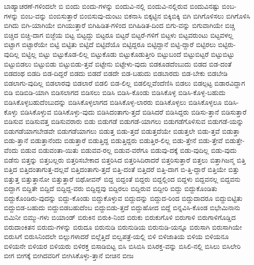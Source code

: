 {ಬಾಹ್ಯಾಚರಣೆ-ಗಳಿಂದಲೇ
ಬಿ
ಬಿಂದು
ಬಿಂದು-ಗಳನ್ನು
ಬಿಂದುವಿ-ನಲ್ಲಿ
ಬಿಂದುವಿ-ನಲ್ಲಿರುವ
ಬಿಂದುವಿನಷ್ಟು
ಬಿಂಬ-ಗಳನ್ನು
ಬಿಂಬ-ವನ್ನು
ಬಿಂಬಿಸುತ್ತಾರೆ
ಬಿಂಬಿಸುವು-ದುಂಟು
ಬಿಕನಾಸಿ
ಬಿಕ್ಕಟ್ಟಿನ
ಬಿಕ್ಕಿಬಿಕ್ಕಿ
ಬಿಗಿ
ಬಿಗಿಗೊಳಿಸಲು
ಬಿಗಿಗೊಳಿಸಿ
ಬಿಗಿದು
ಬಿಗಿ-ಯಾಗಿಯೇ
ಬಿಗಿಯುತ್ತಾರೆ
ಬಿಗಿಹಿಡಿತ-ಗಳಿಂದ
ಬಿಗಿಹಿಡಿತ-ದಿಂದ
ಬಿಗು-ವನ್ನು
ಬಿಗುವಾಗಿಯೇ
ಬಿಚ್ಚಿ
ಬಿಚ್ಚಿದ
ಬಿಚ್ಚಿ-ದಾಗ
ಬಿಜ್ಜೆಯ
ಬಿಟ್ಟ
ಬಿಟ್ಟದ್ದು
ಬಿಟ್ಟರೂ
ಬಿಟ್ಟರೆ
ಬಿಟ್ಟರೆ-ಗಳಿಗೆ
ಬಿಟ್ಟಳು
ಬಿಟ್ಟವರುಂಟು
ಬಿಟ್ಟವಳಲ್ಲ
ಬಿಟ್ಟಾಗ
ಬಿಟ್ಟಾರೆಯೇ
ಬಿಟ್ಟಿ
ಬಿಟ್ಟಿತು
ಬಿಟ್ಟಿದೆ
ಬಿಟ್ಟಿದೆಯೊ
ಬಿಟ್ಟಿದ್ದರೂ
ಬಿಟ್ಟಿದ್ದಾನೆ
ಬಿಟ್ಟಿ-ದ್ದಾರೆ
ಬಿಟ್ಟಿರಲು
ಬಿಟ್ಟಿರು-ವುದಿಲ್ಲ
ಬಿಟ್ಟಿಲ್ಲ
ಬಿಟ್ಟು
ಬಿಟ್ಟುಕೊಡ-ಲಿಲ್ಲ
ಬಿಟ್ಟುಕೊಡು
ಬಿಟ್ಟುಕೊಡುತ್ತೀರಿ
ಬಿಟ್ಟುಬಂದೆ
ಬಿಟ್ಟುಬಿಟ್ಟರೆ
ಬಿಟ್ಟುಬಿಟ್ಟು
ಬಿಟ್ಟುಬಿಡಲು
ಬಿಟ್ಟುಬಿಡು
ಬಿಟ್ಟುಬಿಡು-ತ್ತವೆ
ಬಿಟ್ಟೇನು
ಬಿಟ್ಟೇಳು-ವುದು
ಬಿಡಕೂಡದೆಂಬುದು
ಬಿಡದ
ಬಿಡ-ದಂತೆ
ಬಿಡದಂಥ
ಬಿಡದಿ
ಬಿಡ-ದಿದ್ದರೆ
ಬಿಡದು
ಬಿಡದೆ
ಬಿಡದೇ
ಬಿಡ-ಬಹುದು
ಬಿಡಬಾರದು
ಬಿಡ-ಬೇಕು
ಬಿಡಬೇಡಿ
ಬಿಡಲಾಗು-ವುದಿಲ್ಲ
ಬಿಡಲಾರವು
ಬಿಡಲಾರೆ
ಬಿಡಲಿ
ಬಿಡ-ಲಿಲ್ಲ
ಬಿಡಲಿಲ್ಲವೆಂದೆಣಿಸಿ
ಬಿಡಲು
ಬಿಡಲ್ಪಟ್ಟ
ಬಿಡಾರವಿದ್ದಾಗ
ಬಿಡಿ
ಬಿಡಿಬಿಡಿ-ಯಾಗಿ
ಬಿಡಿಸಲಾಗದ
ಬಿಡಿಸಲು
ಬಿಡಿಸಿ
ಬಿಡಿಸಿ-ಕೊಂಡು
ಬಿಡಿಸಿಕೊಳ್ಳ
ಬಿಡಿಸಿ-ಕೊಳ್ಳ-ಬಹುದು
ಬಿಡಿಸಿಕೊಳ್ಳಬಹುದೆಂಬುದನ್ನು
ಬಿಡಿಸಿಕೊಳ್ಳಲಾಗದ
ಬಿಡಿಸಿಕೊಳ್ಳ-ಲಾರರು
ಬಿಡಿಸಿಕೊಳ್ಳಲು
ಬಿಡಿಸಿಕೊಳ್ಳಲೂ
ಬಿಡಿಸಿ-ಕೊಳ್ಳು
ಬಿಡಿಸಿಕೊಳ್ಳುವ
ಬಿಡಿಸಿಕೊಳ್ಳು-ವುದು
ಬಿಡಿಸಿದಂತಾಗು-ತ್ತದೆ
ಬಿಡಿಸಿದರೆ
ಬಿಡಿಸಿದ್ದರು
ಬಿಡಿಸು-ತ್ತಾನೆ
ಬಿಡಿಸುತ್ತಾರೆ
ಬಿಡಿಸುವ
ಬಿಡಿಸುವತ್ತ
ಬಿಡಿಸುವರಾರು
ಬಿಡು
ಬಿಡುಗಡೆ
ಬಿಡುಗಡೆ-ಯಾಗಲು
ಬಿಡುಗಡೆಗೊಳಿಸುವ
ಬಿಡುಗಡೆ-ಯನ್ನು
ಬಿಡುಗಡೆಯಾಗಬೇಡವೇ
ಬಿಡುಗಡೆಯಾಗಲು
ಬಿಡುತ್ತ
ಬಿಡು-ತ್ತದೆ
ಬಿಡುತ್ತದೆಯೇ
ಬಿಡುತ್ತಲೇ
ಬಿಡು-ತ್ತವೆ
ಬಿಡುತ್ತಾ
ಬಿಡು-ತ್ತಾನೆ
ಬಿಡುತ್ತಾನೆಂದು
ಬಿಡುತ್ತಾರೆ
ಬಿಡುತ್ತಿದ್ದ
ಬಿಡುತ್ತಿದ್ದರು
ಬಿಡುತ್ತಿರ-ಲಿಲ್ಲ
ಬಿಡು-ತ್ತೇನೆ
ಬಿಡು-ತ್ತೇವೆ
ಬಿಡುತ್ತೇ-ವೆಂದು
ಬಿಡುವ
ಬಿಡುವಂತಾ-ಯಿತು
ಬಿಡುವವ-ರಲ್ಲ
ಬಿಡುವ-ವರೆಗೂ
ಬಿಡುವು-ದಕ್ಕೆ
ಬಿಡು-ವುದಿಲ್ಲ
ಬಿಡು-ವುದು
ಬಿಡೆನು
ಬಿತ್ತನ್ನು
ಬಿತ್ತಬಲ್ಲರು
ಬಿತ್ತರಿಸಬೇಕಾದ
ಬಿತ್ತರಿಸಿದ
ಬಿತ್ತರಿಸಿದಿರಾದರೆ
ಬಿತ್ತರಿಸುತ್ತಾರೆ
ಬಿತ್ತಲು
ಬಿತ್ತಾಗಿಜನ್ಮ
ಬಿತ್ತಿ
ಬಿತ್ತಿದ
ಬಿತ್ತಿದಂತಾಗುತ್ತ-ದಲ್ಲವೆ
ಬಿತ್ತಿದಂತಾಗು-ತ್ತದೆ
ಬಿತ್ತಿ-ದಂತೆ
ಬಿತ್ತಿದರೆ
ಬಿತ್ತಿ-ದಾಗ
ಬಿ-ತ್ತಿ-ದ್ದಾರೆ
ಬಿತ್ತಿಯೇ
ಬಿತ್ತು
ಬಿತ್ತುತ್ತ
ಬಿತ್ತುತ್ತಾನೋ
ಬಿತ್ತುತ್ತಾರೆ
ಬಿಥೋವನ್
ಬಿದ್ದ
ಬಿದ್ದಂತೆ
ಬಿದ್ದರು
ಬಿದ್ದಲ್ಲಿಂದ
ಬಿದ್ದಳು
ಬಿದ್ದವನಲ್ಲ
ಬಿದ್ದವನು
ಬಿದ್ದಾಗ
ಬಿದ್ದಿತೇ
ಬಿದ್ದಿದೆ
ಬಿದ್ದಿದ್ದ-ವರು
ಬಿದ್ದಿದ್ದವು
ಬಿದ್ದಿರಲು
ಬಿದ್ದಿರುವ
ಬಿದ್ದೀರಿ
ಬಿದ್ದು
ಬಿದ್ದುಕೊಂಡಿತು
ಬಿದ್ದುಕೊಂಡಿರು-ವುದನ್ನು
ಬಿದ್ದು-ಕೊಂಡು
ಬಿದ್ದುಕೊಳ್ಳುವ
ಬಿದ್ದುದನ್ನು
ಬಿದ್ದುದ-ರಿಂದ
ಬಿದ್ದುದಾದರೂ
ಬಿದ್ದುಬಿಟ್ಟಿತು
ಬಿದ್ದುಬಿಡ-ಬಹುದು
ಬಿದ್ದುಬಿಡಬಹುದೆಂಬ
ಬಿದ್ದುಬಿಡು-ತ್ತದೆ
ಬಿದ್ದುಹೋದ
ಬಿದ್ದೆ
ಬಿನ್ನವಿಸಿ-ಕೊಂಡ
ಬಿಭೇಮಿನಾನು
ಬಿಮಿನೀ
ಬಿಮ್ಮು-ಗಳು
ಬಿಯಾಂಡ್
ಬಿರುಕಿನ
ಬಿರುಕಿ-ನಿಂದ
ಬಿರುಕು
ಬಿರುಕುಗೊಳಿ
ಬಿರುಗಾಳಿ
ಬಿರುಗಾಳಿಗೊಡ್ಡಿದ
ಬಿರುದಾಂಕಿತನ
ಬಿರುದು-ಗಳನ್ನು
ಬಿರುದೂ
ಬಿರುನುಡಿ
ಬಿರುನುಡಿಯ
ಬಿರುನುಡಿ-ಯನ್ನೂ
ಬಿರುಸಾಗಿ
ಬಿರುಸಾಗಿಯೇ
ಬಿರುಸಿಗೆ
ಬಿರುಸಿನಿಂದಲೇ
ಬಿಲ್ಲುಗಳಾದರೆ
ಬಿಲ್ಲೆತ್ತಿದೆ
ಬಿಲ್ವಪತ್ರೆ-ಯಲ್ಲಿ
ಬಿಳಿ
ಬಿಳಿಜಾತಿಯ
ಬಿಳಿಯ
ಬಿಳಿಯನೂ
ಬಿಳಿಯನೇ
ಬಿಳಿಯರ
ಬಿಳಿಯರು
ಬಿಳಿರಕ್ತ
ಬಿಸಾಡಿಬಿಟ್ಟ
ಬಿಸಿ
ಬಿಸಿಬಿಸಿ
ಬಿಸಿರಕ್ತ-ವನ್ನು
ಬಿಸಿಲಿ-ನಲ್ಲಿ
ಬಿಸಿಲು
ಬಿಸಿಲೇರಿ
ಬೀಗ
ಬೀಗಕ್ಕೆ
ಬೀಗಿದವರಿಗೆ
ಬೀಗಿಸಿಕೊಳ್ಳು-ತ್ತಾನೆ
ಬೀಚಿನ
ಬೀಜ
}
